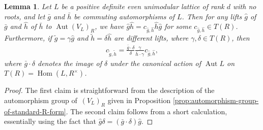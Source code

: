 \documentclass[pdftex]{sigma}
\DeclareMathOperator{\Aut}{Aut}
\DeclareMathOperator{\Hom}{Hom}
\newtheorem{lem}[thm]{Lemma}
\theoremstyle{definition}
\begin{document}
\begin{lem} \label{lem:lifts-of-commuting-pairs}
Let $L$ be a positive definite even unimodular lattice of rank $d$ with no roots, and let $\bar{g}$ and $\bar{h}$ be commuting automorphisms of $L$. Then for any lifts $\hat{g}$ of $\bar{g}$ and $\hat{h}$ of $\bar{h}$ to $\Aut (V_L)_R$, we have $\hat{g}\hat{h} = c_{\hat{g},\hat{h}} \hat{h} \hat{g}$ for some $c_{\hat{g},\hat{h}} \in T(R)$. Furthermore, if $\tilde{g} = \gamma \hat{g}$ and $\tilde{h} = \delta \hat{h}$ are different lifts, where $\gamma, \delta \in T(R)$, then
\begin{gather*} c_{\tilde{g},\tilde{h}} = \frac{\bar{g} \cdot \delta}{\delta} \frac{\gamma}{\bar{h} \cdot \gamma} c_{\hat{g},\hat{h}}, \end{gather*}
where $\bar{g} \cdot \delta$ denotes the image of $\delta$ under the canonical action of $\Aut L$ on $T(R) = \Hom(L, R^\times)$.
\end{lem}
\begin{proof}
The first claim is straightforward from the description of the automorphism group of~$(V_L)_R$ given in Proposition \ref{prop:automorphism-group-of-standard-R-form}. The second claim follows from a short calculation, essentially using the fact that $\hat{g} \delta = (\bar{g} \cdot \delta) \hat{g}$.
\end{proof}
\end{document}
